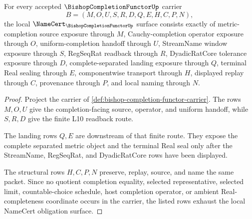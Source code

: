 \begin{theorem}
\label{thm:bishop-completion-functor-namecert-obligations}
For every accepted $\BishopCompletionFunctorUp$ carrier
$$
B=(M,O,U,S,R,D,Q,E,H,C,P,N),
$$
the local $\NameCert_{\BishopCompletionFunctorUp}$ surface consists exactly of metric-completion source exposure through $M$, Cauchy-completion operator exposure through $O$, uniform-completion handoff through $U$, StreamName window exposure through $S$, RegSeqRat readback through $R$, DyadicRatCore tolerance exposure through $D$, complete-separated landing exposure through $Q$, terminal Real sealing through $E$, componentwise transport through $H$, displayed replay through $C$, provenance through $P$, and local naming through $N$.
\end{theorem}
\begin{proof}
Project the carrier of \autoref{def:bishop-completion-functor-carrier}. The rows $M,O,U$ give the completion-facing source, operator, and uniform handoff, while $S,R,D$ give the finite L10 readback route.

The landing rows $Q,E$ are downstream of that finite route. They expose the complete separated metric object and the terminal Real seal only after the StreamName, RegSeqRat, and DyadicRatCore rows have been displayed.

The structural rows $H,C,P,N$ preserve, replay, source, and name the same packet. Since no quotient completion equality, selected representative, selected limit, countable-choice schedule, host completion operator, or ambient Real-completeness coordinate occurs in the carrier, the listed rows exhaust the local NameCert obligation surface.
\end{proof}

